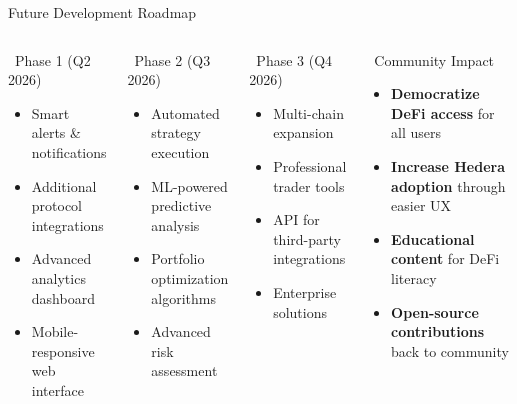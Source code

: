 \documentclass[aspectratio=169]{beamer}
\begin{document}
\begin{frame}{Future Development Roadmap}
\begin{columns}
\begin{block}{\faRocket\ Phase 1 (Q2 2026)}
\begin{itemize}
\item Smart alerts \& notifications
\item Additional protocol integrations
\item Advanced analytics dashboard
\item Mobile-responsive web interface
\end{itemize}
\end{block}

\begin{block}{\faRobot\ Phase 2 (Q3 2026)}
\begin{itemize}
\item Automated strategy execution
\item ML-powered predictive analysis
\item Portfolio optimization algorithms
\item Advanced risk assessment
\end{itemize}
\end{block}

\begin{block}{\faGlobe\ Phase 3 (Q4 2026)}
\begin{itemize}
\item Multi-chain expansion
\item Professional trader tools
\item API for third-party integrations
\item Enterprise solutions
\end{itemize}
\end{block}

\begin{block}{\faHeart\ Community Impact}
\begin{itemize}
\item \textbf{Democratize DeFi access} for all users
\item \textbf{Increase Hedera adoption} through easier UX
\item \textbf{Educational content} for DeFi literacy
\item \textbf{Open-source contributions} back to community
\end{itemize}
\end{block}
\end{columns}
\end{frame}
\end{document}
